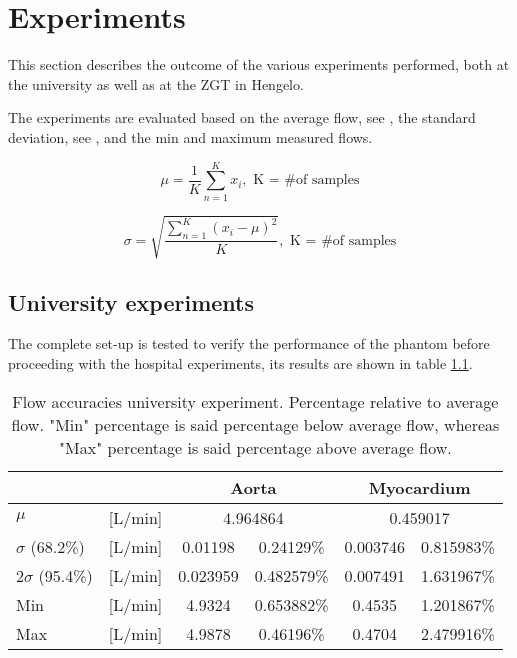 \chapter{Experiments}
\label{ch:experiments}
This section describes the outcome of the various experiments performed, both at the university as well as at the ZGT in Hengelo.

The experiments are evaluated based on the average flow, see , the standard deviation, see , and the min and maximum measured flows.

\begin{equation}
	\mu = \frac{1}{K}\sum_{n=1}^{K}{x_i}, \text{ K = \# of samples}
\end{equation}

\begin{equation}
	\sigma = \sqrt{\frac{\sum_{n=1}^{K}{(x_i - \mu)^2}}{K}}, \text{ K = \# of samples}
\end{equation}


\section{University experiments}
The complete set-up is tested to verify the performance of the phantom before proceeding with the hospital experiments, its results are shown in table \ref{tab:university_first}.
\begin{table}[H]
\caption{Flow accuracies university experiment. Percentage relative to average flow. "Min" percentage is said percentage below average flow, whereas "Max" percentage is said percentage above average flow.}
\label{tab:university_first}
\begin{tabular}{lc|cccc|}
					&    		& \multicolumn{2}{c}{Aorta} 					& \multicolumn{2}{c}{Myocardium} 	\\ \hline
$\mu$ 		& [L/min]   & \multicolumn{2}{c}{4.964864 }	& \multicolumn{2}{c|}{0.459017} \\
$\sigma$ (68.2\%) 	& [L/min]	& 0.01198 & 0.24129\%		& 0.003746 & 0.815983\%                          \\
2$\sigma$ (95.4\%) 	& [L/min] 	& 0.023959 & 0.482579\%		& 0.007491 & 1.631967\%                         \\
Min 				& [L/min]  	& 4.9324 & 0.653882\% & 0.4535 & 1.201867\% \\
Max 				& [L/min]	& 4.9878 & 0.46196\%  & 0.4704 & 2.479916\%  \\ \cline{3-6} 
\end{tabular}
\end{table}
